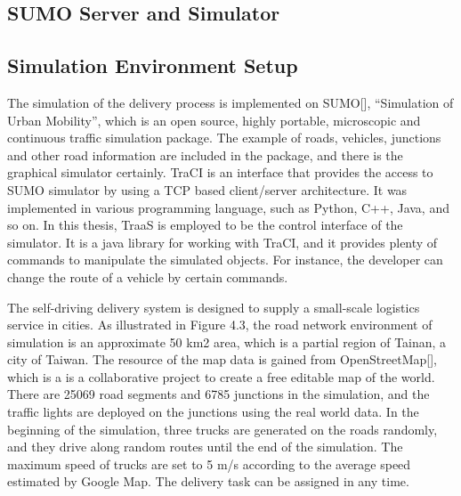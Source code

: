 \documentclass[12pt]{ksthesis}
\begin{document}
\begin{thesis}
{\section{SUMO Server and Simulator}

\subsection{Simulation Environment Setup}

The simulation of the delivery process is implemented on SUMO[], “Simulation of Urban Mobility”, which is an open source, highly portable, microscopic and continuous traffic simulation package. The example of roads, vehicles, junctions and other road information are included in the package, and there is the graphical simulator certainly. TraCI is an interface that provides the access to SUMO simulator by using a TCP based client/server architecture. It was implemented in various programming language, such as Python, C++, Java, and so on. In this thesis, TraaS is employed to be the control interface of the simulator. It is a java library for working with TraCI, and it provides plenty of commands to manipulate the simulated objects. For instance, the developer can change the route of a vehicle by certain commands.

The self-driving delivery system is designed to supply a small-scale logistics service in cities. As illustrated in Figure 4.3, the road network environment of simulation is an approximate 50 km2 area, which is a partial region of Tainan, a city of Taiwan. The resource of the map data is gained from OpenStreetMap[], which is a is a collaborative project to create a free editable map of the world. There are 25069 road segments and 6785 junctions in the simulation, and the traffic lights are deployed on the junctions using the real world data. In the beginning of the simulation, three trucks are generated on the roads randomly, and they drive along random routes until the end of the simulation. The maximum speed of trucks are set to 5 m/s according to the average speed estimated by Google Map. The delivery task can be assigned in any time.

}
\end{thesis}
\end{document}
